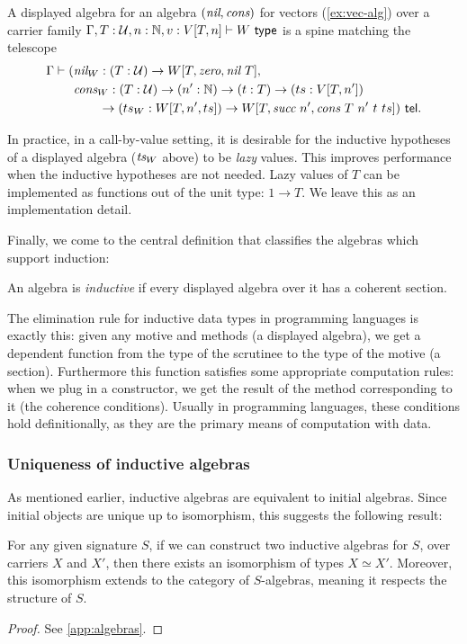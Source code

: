 \begin{example}[Vectors]\label{ex:vec-disp-alg}
A displayed algebra for an algebra $(\textit{nil}, \textit{cons})$ for vectors
(\cref{ex:vec-alg}) over a carrier family $\Gamma, T : \mathcal{U}, n : \mathbb{N}, v
: V[T, n] \vdash W \ \textsf{type}$ is a spine matching
the telescope
\begin{align*}
 \Gamma \vdash (&\n{nil}_W : (T : \univ) \to W[T, \n{zero}, \n{nil}\ T], \\
&\n{cons}_W : (T : \univ) \to (n' : \mathbb{N}) \to (t : T) \to (ts : V[T,n']) \\
&\qquad \to (ts_W : W[T, n', ts]) \to W[T, \n{succ}\ n', \n{cons}\ T\ n'\ t\ ts]) \tel.
\end{align*}
\end{example}

In practice, in a call-by-value setting, it is desirable for the inductive
hypotheses of a displayed algebra ($\textit{ts}_W$ above) to be
\emph{lazy} values. This improves performance when the inductive hypotheses are
not needed. Lazy values of $T$ can be implemented as functions out of the unit
type: $1 \to T$. We leave this as an implementation detail.

Finally, we come to the central definition
that classifies the algebras which
support induction:
\begin{definition}
An algebra is \emph{inductive} if every displayed algebra over it has a coherent section.
\end{definition}
The elimination rule for inductive data types in programming languages is
exactly this: given any motive and methods (a displayed algebra), we get a
dependent function from the type of the scrutinee to the type of the motive (a
section). Furthermore this function satisfies some appropriate computation rules:
when we plug in a constructor, we get the result of the method corresponding to it (the coherence conditions).
Usually in programming languages, these conditions hold definitionally, as they are the primary means
of computation with data.

\subsubsection{Uniqueness of inductive algebras}

As mentioned earlier, inductive algebras are equivalent to initial algebras.
Since initial objects are unique up to isomorphism, this suggests the following result:

\begin{theorem}\label{thm:unique-inductive-algebras}
For any given signature $S$, if we can construct two inductive algebras for $S$,
over carriers $X$ and $X'$, then there exists an isomorphism of types $X \simeq X'$. Moreover,
this isomorphism extends to the category of $S$-algebras, meaning it respects the structure of $S$.
\begin{proof}
See \cref{app:algebras}.
\end{proof}
\end{theorem}


